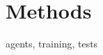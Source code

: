 \documentclass[sigconf]{acmart}
\begin{document}
\section{Methods}
 agents, training, tests
\\
\\
\\
\\
\\
\\
\\
\\
\\
\\
\\
\\
\\
\\
\\
\\
\\
\\
\\
\\
\end{document}
